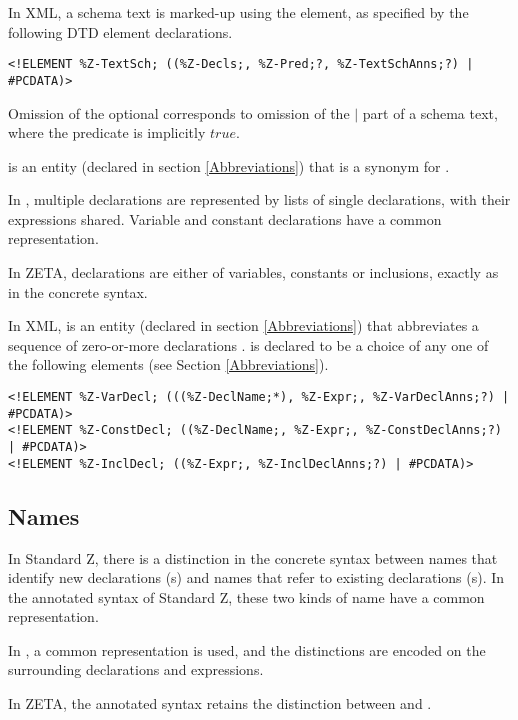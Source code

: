 \documentclass[a4paper,10pt]{article}
\def\Zeta{{\sf Z{\small E}T{\small A}}}
\begin{document}
In XML, a schema text is marked-up using
the  element,
as specified by the following DTD element declarations.

\begin{verbatim}
<!ELEMENT %Z-TextSch; ((%Z-Decls;, %Z-Pred;?, %Z-TextSchAnns;?) | #PCDATA)>
\end{verbatim}

Omission of the optional  corresponds to
omission of the $|$ part of a schema text,
where the predicate is implicitly $true$.

 is an entity (declared in section \ref{Abbreviations})
that is a synonym for .

In \CADiZ,
multiple declarations are represented by lists of single declarations,
with their expressions shared.
Variable and constant declarations have a common representation.

In \Zeta, declarations are either of variables, constants or inclusions,
exactly as in the concrete syntax.

In XML,  is an entity (declared in section \ref{Abbreviations})
that abbreviates a sequence of zero-or-more declarations .
 is declared to be a choice of
any one of the following elements (see Section \ref{Abbreviations}).

\begin{verbatim}
<!ELEMENT %Z-VarDecl; (((%Z-DeclName;*), %Z-Expr;, %Z-VarDeclAnns;?) | #PCDATA)>
<!ELEMENT %Z-ConstDecl; ((%Z-DeclName;, %Z-Expr;, %Z-ConstDeclAnns;?) | #PCDATA)>
<!ELEMENT %Z-InclDecl; ((%Z-Expr;, %Z-InclDeclAnns;?) | #PCDATA)>
\end{verbatim}

\subsection{Names}

In Standard Z, there is a distinction in the concrete syntax
between names that identify new declarations (s)
and names that refer to existing declarations (s).
In the annotated syntax of Standard Z,
these two kinds of name have a common representation.

In \CADiZ, a common representation is used,
and the distinctions are encoded on the surrounding
declarations and expressions.

In \Zeta, the annotated syntax retains the distinction between
 and .
\end{document}
